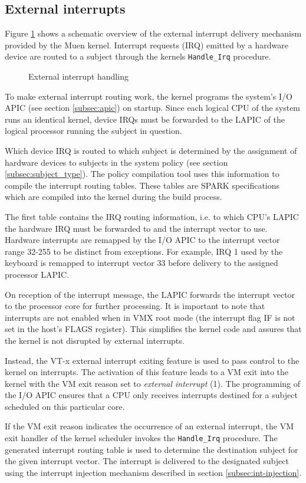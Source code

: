 \subsection{External interrupts}\label{subsec:external-ints}
Figure \ref{fig:external-interrupt} shows a schematic overview of the external
interrupt delivery mechanism provided by the Muen kernel. Interrupt requests
(IRQ) emitted by a hardware device are routed to a subject through
the kernels \texttt{Handle\_Irq} procedure.

\begin{figure}[h]
	\centering
	
	\caption{External interrupt handling}
	\label{fig:external-interrupt}
\end{figure}

To make external interrupt routing work, the kernel programs the system's I/O
APIC (see section \ref{subsec:apic}) on startup. Since each logical CPU of the
system runs an identical kernel, device IRQs must be forwarded to the LAPIC of
the logical processor running the subject in question.

Which device IRQ is routed to which subject is determined by the assignment of
hardware devices to subjects in the system policy (see section
\ref{subsec:subject_type}). The policy compilation tool uses this information to
compile the interrupt routing tables. These tables are SPARK specifications
which are compiled into the kernel during the build process.

The first table contains the IRQ routing information, i.e. to which CPU's LAPIC
the hardware IRQ must be forwarded to and the interrupt vector to use. Hardware
interrupts are remapped by the I/O APIC to the interrupt vector range 32-255 to
be distinct from exceptions. For example, IRQ 1 used by the keyboard is remapped
to interrupt vector 33 before delivery to the assigned processor LAPIC.

On reception of the interrupt message, the LAPIC forwards the interrupt vector
to the processor core for further processing. It is important to note that
interrupts are not enabled when in VMX root mode (the interrupt flag
IF is not set in the host's FLAGS register). This simplifies the
kernel code and assures that the kernel is not disrupted by external interrupts.

Instead, the VT-x external interrupt exiting feature is used to pass control to
the kernel on interrupts. The activation of this feature leads to a VM exit
into the kernel with the VM exit reason set to \emph{external interrupt} (1).
The programming of the I/O APIC ensures that a CPU only receives interrupts
destined for a subject scheduled on this particular core.

If the VM exit reason indicates the occurrence of an external interrupt, the VM
exit handler of the kernel scheduler invokes the \texttt{Handle\_Irq} procedure.
The generated interrupt routing table is used to determine the destination
subject for the given interrupt vector. The interrupt is delivered to the
designated subject using the interrupt injection mechanism described in section
\ref{subsec:int-injection}.
